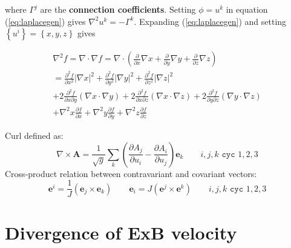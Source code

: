 \documentclass[12pt]{article}
\begin{document}
\noindent where $\Gamma^j$ are the {\bf connection coefficients}. Setting $\phi = u^k$ in equation (\ref{eq:laplacegen})
gives $\nabla^2u^k = -\Gamma^k$. Expanding (\ref{eq:laplacegen}) and setting $\left\{u^i\right\} = \left\{x, y, z\right\}$ gives

\begin{eqnarray}
\nabla^2f = \nabla\cdot\nabla f = \nabla\cdot\left(\frac{\partial}{\partial x}\nabla x + \frac{\partial}{\partial y}\nabla y + \frac{\partial}{\partial z}\nabla z\right) \nonumber \\
\label{eq:general_laplacian}
= \frac{\partial^2 f}{\partial x^2}\left|\nabla x\right|^2 + \frac{\partial^2 f}{\partial y^2}\left|\nabla y\right|^2 + \frac{\partial^2 f}{\partial z^2}\left|\nabla z\right|^2 \\
+2\frac{\partial^2 f}{\partial x\partial y}\left(\nabla x\cdot\nabla y\right)
+2\frac{\partial^2 f}{\partial x\partial z}\left(\nabla x\cdot\nabla z\right)
+2\frac{\partial^2 f}{\partial y\partial z}\left(\nabla y\cdot\nabla z\right) \nonumber \\
+\nabla^2x\frac{\partial f}{\partial x} +\nabla^2y\frac{\partial f}{\partial y} + \nabla^2z\frac{\partial f}{\partial z} \nonumber
\end{eqnarray}

Curl defined as:
\begin{equation}
\nabla\times\mathbf{A} = \frac{1}{\sqrt{g}}\sum_k\left(\frac{\partial A_j}{\partial u_i} - \frac{\partial A_i}{\partial u_j}\right)\mathbf{e}_k \qquad i,j,k \texttt{ cyc } 1,2,3
\label{eq:curl_def}
\end{equation}
Cross-product relation between contravariant and covariant vectors:
\begin{equation}
\mathbf{e}^i = \frac{1}{J}\left(\mathbf{e}_j \times \mathbf{e}_k\right) \qquad \mathbf{e}_i = J\left(\mathbf{e}^j \times \mathbf{e}^k\right) \qquad i,j,k \texttt{ cyc } 1,2,3
\label{eq:cross_relation}
\end{equation}

\section{Divergence of ExB velocity}
\end{document}
